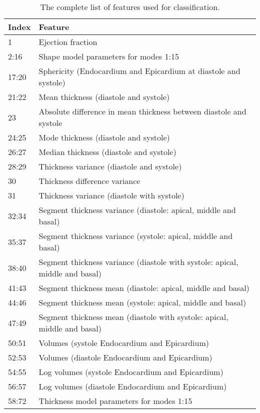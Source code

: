 \documentclass{llncs}
\begin{document}
\begin{table}

		\begin{center}
	
		\begin{tabular}{l|l|}
\textbf{Index} \space & \multicolumn{1}{l}{\textbf{Feature}}
\\
 \hline
\cline{1-2}
 1 & Ejection fraction \\
\cline{1-2}
 2:16 & Shape model parameters for modes 1:15\\
\cline{1-2}
 17:20 & Sphericity (Endocardium and Epicardium at diastole and systole)\\
 \cline{1-2}
 21:22 & Mean thickness (diastole and systole)\\
  23 & Absolute difference in mean thickness between diastole and systole\\
 
  24:25 & Mode thickness (diastole and systole)\\
  
  26:27 & Median thickness (diastole and systole)\\
  
  28:29 & Thickness variance (diastole and systole)\\
  
  30 & Thickness difference variance\\
  
  31 & Thickness variance (diastole with systole)\\
   \cline{1-2}
  32:34 & Segment thickness variance (diastole: apical, middle and basal)\\
   35:37 & Segment thickness variance (systole: apical, middle and basal)\\
  
  38:40 & Segment thickness variance (diastole with systole: apical, middle and basal)\\
  \cline{1-2}
  41:43 & Segment thickness mean (diastole: apical, middle and basal)\\
  44:46 & Segment thickness mean (systole: apical, middle and basal)\\
   47:49 & Segment thickness mean (diastole with systole: apical, middle and basal)\\
   \cline{1-2}
   50:51 & Volumes (systole Endocardium and Epicardium) \\
   52:53 & Volumes (diastole Endocardium and Epicardium) \\
   \cline{1-2}
    54:55 & Log volumes (systole Endocardium and Epicardium) \\
   56:57 & Log volumes (diastole Endocardium and Epicardium) \\
    \cline{1-2}
    58:72 & Thickness model parameters for modes 1:15\\

     \cline{1-2}
     \end{tabular}

		\caption{The complete list of features used for classification.}
		\label{table:featurelist}
		\end{center}
		\end{table}
\end{document}
